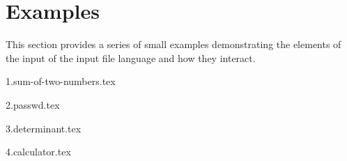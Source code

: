 
\chapter{Examples}
{
	This section provides a series of small examples
	demonstrating the elements of the input of the input file language
	and how they interact.
	
	{1.sum-of-two-numbers.tex}
	
	{2.passwd.tex}
	
	{3.determinant.tex}
	
	{4.calculator.tex}
}

